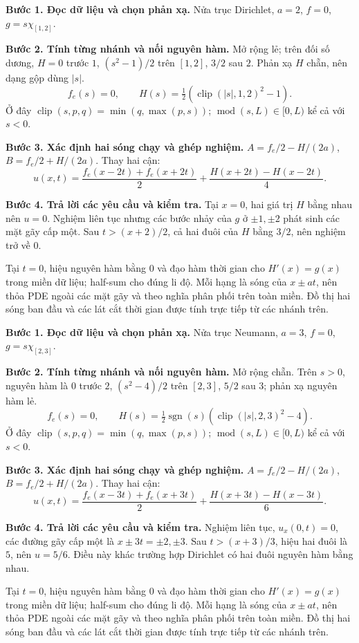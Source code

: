\textbf{Bước 1. Đọc dữ liệu và chọn phản xạ.} Nửa trục Dirichlet, $a=2$, $f=0$, $g=s\chi_{[1,2]}$.

\textbf{Bước 2. Tính từng nhánh và nối nguyên hàm.} Mở rộng lẻ; trên đối số dương, $H=0$ trước $1$, $(s^2-1)/2$ trên $[1,2]$, $3/2$ sau $2$. Phản xạ $H$ chẵn, nên dạng gộp dùng $|s|$.
\[f_e(s)=0,\qquad H(s)=\tfrac12(\operatorname{clip}(|s|,1,2)^2-1).\]
Ở đây $\operatorname{clip}(s,p,q)=\min(q,\max(p,s))$; $\operatorname{mod}(s,L)\in[0,L)$ kể cả với $s<0$.

\textbf{Bước 3. Xác định hai sóng chạy và ghép nghiệm.} $A=f_e/2-H/(2a)$, $B=f_e/2+H/(2a)$. Thay hai cận:
\[u(x,t)=\frac{f_e(x-2t)+f_e(x+2t)}2+\frac{H(x+2t)-H(x-2t)}{4}.\]

\textbf{Bước 4. Trả lời các yêu cầu và kiểm tra.} Tại $x=0$, hai giá trị $H$ bằng nhau nên $u=0$. Nghiệm liên tục nhưng các bước nhảy của $g$ ở $\pm1,\pm2$ phát sinh các mặt gãy cấp một. Sau $t>(x+2)/2$, cả hai đuôi của $H$ bằng $3/2$, nên nghiệm trở về $0$.

Tại $t=0$, hiệu nguyên hàm bằng $0$ và đạo hàm thời gian cho $H'(x)=g(x)$ trong miền dữ liệu; half-sum cho đúng li độ. Mỗi hạng là sóng của $x\pm at$, nên thỏa PDE ngoài các mặt gãy và theo nghĩa phân phối trên toàn miền. Đồ thị hai sóng ban đầu và các lát cắt thời gian được tính trực tiếp từ các nhánh trên.

\textbf{Bước 1. Đọc dữ liệu và chọn phản xạ.} Nửa trục Neumann, $a=3$, $f=0$, $g=s\chi_{[2,3]}$.

\textbf{Bước 2. Tính từng nhánh và nối nguyên hàm.} Mở rộng chẵn. Trên $s>0$, nguyên hàm là $0$ trước $2$, $(s^2-4)/2$ trên $[2,3]$, $5/2$ sau $3$; phản xạ nguyên hàm lẻ.
\[f_e(s)=0,\qquad H(s)=\tfrac12\operatorname{sgn}(s)(\operatorname{clip}(|s|,2,3)^2-4).\]
Ở đây $\operatorname{clip}(s,p,q)=\min(q,\max(p,s))$; $\operatorname{mod}(s,L)\in[0,L)$ kể cả với $s<0$.

\textbf{Bước 3. Xác định hai sóng chạy và ghép nghiệm.} $A=f_e/2-H/(2a)$, $B=f_e/2+H/(2a)$. Thay hai cận:
\[u(x,t)=\frac{f_e(x-3t)+f_e(x+3t)}2+\frac{H(x+3t)-H(x-3t)}{6}.\]

\textbf{Bước 4. Trả lời các yêu cầu và kiểm tra.} Nghiệm liên tục, $u_x(0,t)=0$, các đường gãy cấp một là $x\pm3t=\pm2,\pm3$. Sau $t>(x+3)/3$, hiệu hai đuôi là $5$, nên $u=5/6$. Điều này khác trường hợp Dirichlet có hai đuôi nguyên hàm bằng nhau.

Tại $t=0$, hiệu nguyên hàm bằng $0$ và đạo hàm thời gian cho $H'(x)=g(x)$ trong miền dữ liệu; half-sum cho đúng li độ. Mỗi hạng là sóng của $x\pm at$, nên thỏa PDE ngoài các mặt gãy và theo nghĩa phân phối trên toàn miền. Đồ thị hai sóng ban đầu và các lát cắt thời gian được tính trực tiếp từ các nhánh trên.

